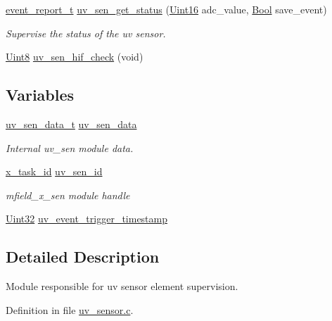\begin{DoxyCompactItemize}
\hyperlink{a00021_d6/d66/a00441}{event\+\_\+report\+\_\+t} \hyperlink{a00073_a354d25047e79397dbe5525178f19cae0}{uv\+\_\+sen\+\_\+get\+\_\+status} (\hyperlink{a00072_a59a9f6be4562c327cbfb4f7e8e18f08b}{Uint16} adc\+\_\+value, \hyperlink{a00072_a253b248072cfc8bd812c69acd0046eed}{Bool} save\+\_\+event)
\begin{DoxyCompactList}\small\item\em Supervise the status of the uv sensor. \end{DoxyCompactList}\item 
\hyperlink{a00072_af84840501dec18061d18a68c162a8fa2}{Uint8} \hyperlink{a00073_a7655317bd792ec00a58a1e8bcca3aed6}{uv\+\_\+sen\+\_\+hif\+\_\+check} (void)
\end{DoxyCompactItemize}
\subsection*{Variables}
\begin{DoxyCompactItemize}
\item 
\hyperlink{a00035_d9/d30/a00848}{uv\+\_\+sen\+\_\+data\+\_\+t} \hyperlink{a00073_adb4cffe9b88704fe686a94fe9996fa52}{uv\+\_\+sen\+\_\+data}
\begin{DoxyCompactList}\small\item\em Internal uv\+\_\+sen module data. \end{DoxyCompactList}\item 
\hyperlink{a00036_ad5c3c5fbfd3e4aadf22830395484a71d}{x\+\_\+task\+\_\+id} \hyperlink{a00073_afd789f3f9ea182d28d4f16db0d8d5652}{uv\+\_\+sen\+\_\+id}
\begin{DoxyCompactList}\small\item\em mfield\+\_\+x\+\_\+sen module handle \end{DoxyCompactList}\item 
\hyperlink{a00072_aba99025e657f892beb7ff31cecf64653}{Uint32} \hyperlink{a00073_a4e8cc59a7a6d147cfe43b64ce2f44e7a}{uv\+\_\+event\+\_\+trigger\+\_\+timestamp}
\end{DoxyCompactItemize}


\subsection{Detailed Description}
Module responsible for uv sensor element supervision. 



Definition in file \hyperlink{a00073_source}{uv\+\_\+sensor.\+c}.



